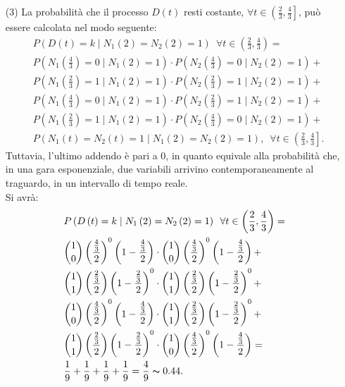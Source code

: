 \documentclass[12pt]{homework}
\begin{document}
\begin{enumerate}
   \item[(3)]
   La probabilità che il processo $D\left(t\right)$ resti costante, $\forall t \in \left(\frac{2}{3},\frac{4}{3}\right]$, può essere calcolata nel modo seguente:
   \begin{align*}
   &P\left(D\left(t\right)=k \mid N_{1}\left(2\right)=N_{2}\left(2\right)=1\right) \,\,\,\forall t \in \left(\frac{2}{3},\frac{4}{3}\right)=\\
   &P\left(N_{1}\left(\frac{4}{3}\right)=0 \mid N_{1}\left(2\right)=1\right)\cdot P\left(N_{2}\left(\frac{4}{3}\right)=0 \mid N_{2}\left(2\right)=1\right)+\\
   &P\left(N_{1}\left(\frac{2}{3}\right)=1 \mid N_{1}\left(2\right)=1\right)\cdot P\left(N_{2}\left(\frac{2}{3}\right)=1 \mid N_{2}\left(2\right)=1\right)+\\
   &P\left(N_{1}\left(\frac{4}{3}\right)=0 \mid N_{1}\left(2\right)=1\right)\cdot P\left(N_{2}\left(\frac{2}{3}\right)=1 \mid N_{2}\left(2\right)=1\right)+\\
   &P\left(N_{1}\left(\frac{2}{3}\right)=1 \mid N_{1}\left(2\right)=1\right)\cdot P\left(N_{2}\left(\frac{4}{3}\right)=0 \mid N_{2}\left(2\right)=1\right)+\\
   &P\left(N_{1}\left(t\right)=N_{2}\left(t\right)=1 \mid N_{1}\left(2\right)= N_{2}\left(2\right)=1\right), \,\,\, \forall t \in \left(\frac{2}{3},\frac{4}{3}\right].
   \end{align*}
   Tuttavia, l'ultimo addendo è pari a 0, in quanto equivale alla probabilità che, in una gara esponenziale, due variabili arrivino contemporaneamente al traguardo, in un intervallo di tempo reale. \\
Si avrà:
\begin{align*}
&P\left(D\left(t\right)=k \mid N_{1}\left(2\right)=N_{2}\left(2\right)=1\right) \,\,\,\forall t \in \left(\frac{2}{3},\frac{4}{3}\right)=\\
&\binom{1}{0}\left(\frac{\frac{4}{3}}{2}\right)^{0}\left(1-\frac{\frac{4}{3}}{2}\right)\cdot\binom{1}{0}\left(\frac{\frac{4}{3}}{2}\right)^{0}\left(1-\frac{\frac{4}{3}}{2}\right)+\\
&\binom{1}{1}\left(\frac{\frac{2}{3}}{2}\right)\left(1-\frac{\frac{2}{3}}{2}\right)^{0}\cdot\binom{1}{1}\left(\frac{\frac{2}{3}}{2}\right)\left(1-\frac{\frac{2}{3}}{2}\right)^{0}+\\
&\binom{1}{0}\left(\frac{\frac{4}{3}}{2}\right)^{0}\left(1-\frac{\frac{4}{3}}{2}\right)\cdot\binom{1}{1}\left(\frac{\frac{2}{3}}{2}\right)\left(1-\frac{\frac{2}{3}}{2}\right)^{0}+ \\
&\binom{1}{1}\left(\frac{\frac{2}{3}}{2}\right)\left(1-\frac{\frac{2}{3}}{2}\right)^{0}\cdot\binom{1}{0}\left(\frac{\frac{4}{3}}{2}\right)^{0}\left(1-\frac{\frac{4}{3}}{2}\right)=\\
&\frac{1}{9}+\frac{1}{9}+\frac{1}{9}+\frac{1}{9}=\frac{4}{9}\thicksim 0.44.
 \end{align*}   
  \end{enumerate} 
  
\end{document}

